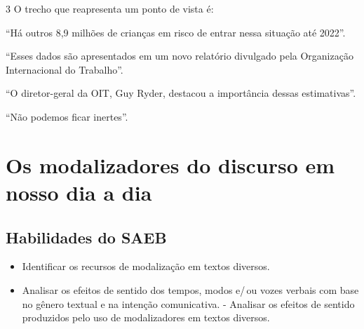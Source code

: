 \num{3} O trecho que reapresenta um ponto de vista é:

\begin{escolha}
\item ``Há outros 8,9 milhões de crianças em risco de entrar nessa situação
até 2022''.
\item ``Esses dados são apresentados em um novo relatório divulgado pela
Organização Internacional do Trabalho''.
\item ``O diretor-geral da OIT, Guy Ryder, destacou a importância dessas
estimativas''.
\item ``Não podemos ficar inertes''.
\end{escolha}




\chapter{Os modalizadores do discurso em nosso dia a dia}

\section*{Habilidades do SAEB}
\begin{itemize}
\item Identificar os recursos de modalização em textos
diversos. 
\item Analisar os efeitos de sentido dos tempos, modos e/\,ou vozes
verbais com base no gênero textual e na intenção comunicativa. -
Analisar os efeitos de sentido produzidos pelo uso de modalizadores em
textos diversos.
\end{itemize}

